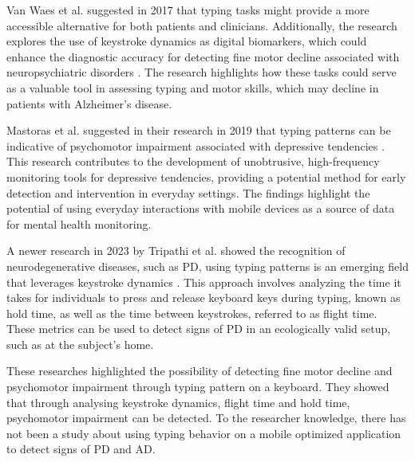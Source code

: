 Van Waes et al. suggested in 2017 that typing tasks might provide a more accessible alternative for both patients and clinicians. 
Additionally, the research explores the use of keystroke dynamics as digital biomarkers, which could enhance the diagnostic accuracy for detecting fine motor decline associated with neuropsychiatric disorders \cite{VanWaes2017}. 
The research highlights how these tasks could serve as a valuable tool in assessing typing and motor skills, which may decline in patients with Alzheimer's disease.

Mastoras et al. suggested in their research in 2019  that typing patterns can be indicative of psychomotor impairment associated with depressive tendencies \cite{Mastoras2019}. 
This research contributes to the development of unobtrusive, high-frequency monitoring tools for depressive tendencies, providing a potential method for early detection and intervention in everyday settings. 
The findings highlight the potential of using everyday interactions with mobile devices as a source of data for mental health monitoring.

A newer research in 2023 by Tripathi et al. showed the recognition of neurodegenerative diseases, such as \ac{PD}, using typing patterns is an emerging field that leverages keystroke dynamics \cite{Tripathi2023}. 
This approach involves analyzing the time it takes for individuals to press and release keyboard keys during typing, known as hold time, as well as the time between keystrokes, referred to as flight time. 
These metrics can be used to detect signs of \ac{PD} in an ecologically valid setup, such as at the subject's home.

These researches highlighted the possibility of detecting fine motor decline and psychomotor impairment through typing pattern on a keyboard. 
They showed that through analysing keystroke dynamics, flight time and hold time, psychomotor impairment can be detected. 
To the researcher knowledge, there has not been a study about using typing behavior on a mobile optimized application to detect signs of \ac{PD} and \ac{AD}.
